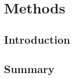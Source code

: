 \chapter{Methods} \label{chapter:methods}

\section{Introduction} \label{sec:methods:intro}

\section{Summary} \label{sec:methods:summary} 